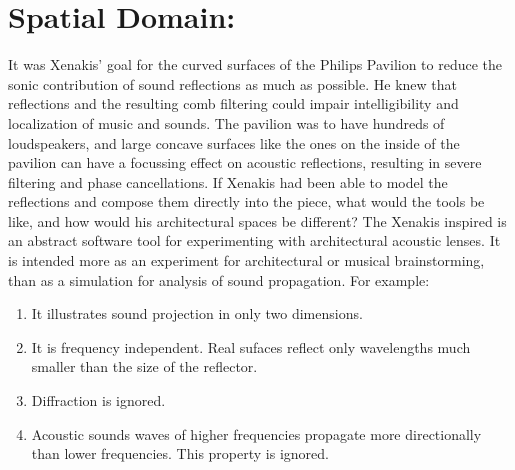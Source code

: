 \chapter{Spatial Domain: }
\label{ch:ref-mod}

It was Xenakis' goal for the curved surfaces of the Philips Pavilion
to reduce the sonic contribution of sound reflections as much as
possible.\cite{philips1958} He knew that reflections and the resulting
comb filtering could impair intelligibility and localization of music
and sounds. The pavilion was to have hundreds of loudspeakers, and
large concave surfaces like the ones on the inside of the pavilion can
have a focussing effect on acoustic reflections, resulting in severe
filtering and phase cancellations.\cite{Vercammen2008} If Xenakis had
been able to model the reflections and compose them directly into the
piece, what would the tools be like, and how would his architectural
spaces be different? The Xenakis inspired  is an abstract
software tool for experimenting with architectural acoustic lenses. It
is intended more as an experiment for architectural or musical
brainstorming, than as a simulation for analysis of sound
propagation. For example:
\begin{enumerate}
\item It illustrates sound projection in only two dimensions.
\item It is frequency independent. Real sufaces reflect only
  wavelengths much smaller than the size of the
  reflector.\cite{Zhixin2005} 
\item Diffraction is ignored. 
\item Acoustic sounds waves of higher frequencies propagate more
  directionally than lower frequencies. This property is ignored.
\end{enumerate}

